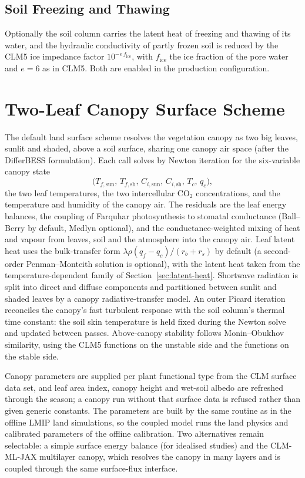 \documentclass[11pt,twoside]{report}
\begin{document}
\subsection{Soil Freezing and Thawing}
Optionally the soil column carries the latent heat of freezing and thawing of
its water, and the hydraulic conductivity of partly frozen soil is reduced by
the CLM5 ice impedance factor $10^{-e\,f_{\mathrm{ice}}}$, with
$f_{\mathrm{ice}}$ the ice fraction of the pore water and $e=6$ as in CLM5.
Both are enabled in the production configuration.

\section{Two-Leaf Canopy Surface Scheme}
\label{sec:two-leaf}

The default land surface scheme resolves the vegetation canopy as two big
leaves, sunlit and shaded, above a soil surface, sharing one canopy air space
(after the DifferBESS formulation).  Each call solves by Newton iteration for
the six-variable canopy state
\begin{equation}
  \bigl(T_{f,\mathrm{sun}},\,T_{f,\mathrm{sh}},\,C_{i,\mathrm{sun}},\,
  C_{i,\mathrm{sh}},\,T_c,\,q_c\bigr),
\end{equation}
the two leaf temperatures, the two intercellular CO$_2$ concentrations, and the
temperature and humidity of the canopy air.  The residuals are the leaf energy
balances, the coupling of Farquhar photosynthesis \citep{Farquhar1980} to
stomatal conductance (Ball--Berry by default, Medlyn optional), and the
conductance-weighted mixing of heat and vapour from leaves, soil and the
atmosphere into the canopy air.  Leaf latent heat uses the bulk-transfer form
$\lambda\rho(q_f-q_c)/(r_b+r_s)$ by default (a second-order
Penman--Monteith solution is optional), with the latent heat taken from the
temperature-dependent family of Section~\ref{sec:latent-heat}.  Shortwave
radiation is split into direct and diffuse components and partitioned
between sunlit and shaded leaves by a canopy radiative-transfer model.  An
outer Picard iteration reconciles the canopy's fast turbulent response with
the soil column's thermal time constant: the soil skin temperature is held
fixed during the Newton solve and updated between passes.  Above-canopy
stability follows Monin--Obukhov similarity, using the CLM5 functions on the
unstable side and the \citet{Beljaars1991} functions on the stable side.

Canopy parameters are supplied per plant functional type from the CLM
surface data set, and leaf area index, canopy height and wet-soil albedo are
refreshed through the season; a canopy run without that surface data is
refused rather than given generic constants.  The parameters are built by the
same routine as in the offline LMIP land simulations, so the coupled model
runs the land physics and calibrated parameters of the offline calibration.  Two alternatives
remain selectable: a simple surface energy balance (for idealised studies)
and the CLM-ML-JAX multilayer canopy, which resolves the canopy in many
layers and is coupled through the same surface-flux interface.
\end{document}
